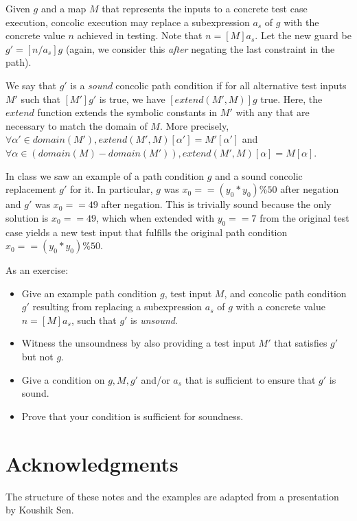 \documentclass[11pt]{article}
\begin{document}
Given $g$ and a map $M$ that represents the inputs to a concrete test case
execution, concolic execution may replace a subexpression $a_s$ of $g$ with the
concrete value $n$ achieved in testing. Note that $n=[M]a_s$. Let the new guard
be $g'=[n/a_s]g$ (again, we consider this \textit{after} negating the last
constraint in the path).

We say that $g'$ is a \textit{sound} concolic path condition if for all
alternative test inputs $M'$ such that $[M']g'$ is true, we have
$[extend(M',M)]g$ true. Here, the $extend$ function extends the symbolic
constants in $M'$ with any that are necessary to match the domain of $M$. More
precisely, $\forall \alpha' \in domain(M'), extend(M',M)[\alpha']=M'[\alpha']$
and $\forall \alpha \in (domain(M)-domain(M')), extend(M',M)[\alpha]=M[\alpha]$.

In class we saw an example of a path condition $g$ and a sound concolic
replacement $g'$ for it. In particular, $g$ was $x_0 == (y_0*y_0)\%50$ after
negation and $g'$ was $x_0==49$ after negation. This is trivially sound because
the only solution is $x_0==49$, which when extended with $y_0==7$ from the
original test case yields a new test input that fulfills the original path
condition $x_0 == (y_0*y_0)\%50$.

As an exercise:
\begin{itemize}
\item Give an example path condition $g$, test input $M$, and concolic path
  condition $g'$ resulting from replacing a subexpression $a_s$ of $g$ with a
  concrete value $n=[M]a_s$, such that $g'$ is \textit{unsound}.

\item Witness the unsoundness by also providing a test input $M'$ that satisfies
  $g'$ but not $g$.

\item Give a condition on $g, M, g'$ and/or $a_s$ that is sufficient to ensure that $g'$ is sound.
\item Prove that your condition is sufficient for soundness.
\end{itemize}

\section{Acknowledgments}

The structure of these notes and the examples are adapted from a presentation by Koushik Sen.



\end{document}
